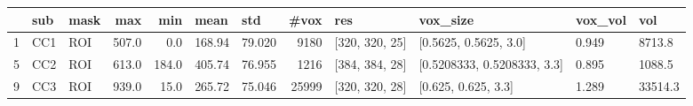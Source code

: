 \begin{tabular}{lllrrllrllll}
\toprule
{} &  sub & mask &    max &    min &    mean &     std &   \#vox &             res &                     vox\_size & vox\_vol &      vol \\
\midrule
1 &  CC1 &  ROI &  507.0 &    0.0 &  168.94 &  79.020 &   9180 &  [320, 320, 25] &        [0.5625, 0.5625, 3.0] &   0.949 &   8713.8 \\
5 &  CC2 &  ROI &  613.0 &  184.0 &  405.74 &  76.955 &   1216 &  [384, 384, 28] &  [0.5208333, 0.5208333, 3.3] &   0.895 &   1088.5 \\
9 &  CC3 &  ROI &  939.0 &   15.0 &  265.72 &  75.046 &  25999 &  [320, 320, 28] &          [0.625, 0.625, 3.3] &   1.289 &  33514.3 \\
\bottomrule
\end{tabular}
